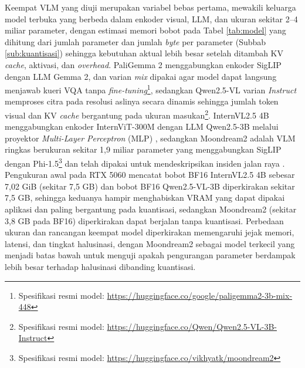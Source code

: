 Keempat VLM yang diuji merupakan variabel bebas pertama, mewakili keluarga model terbuka yang berbeda dalam enkoder visual, LLM, dan ukuran sekitar 2--4 miliar parameter, dengan estimasi memori bobot pada Tabel \ref{tab:model} yang dihitung dari jumlah parameter dan jumlah \textit{byte} per parameter (Subbab \ref{sub:kuantisasi}) sehingga kebutuhan aktual lebih besar setelah ditambah KV \textit{cache}, aktivasi, dan \textit{overhead}. PaliGemma 2 menggabungkan enkoder SigLIP dengan LLM Gemma 2, dan varian \textit{mix} dipakai agar model dapat langsung menjawab kueri VQA tanpa \textit{fine-tuning}\footnote{Spesifikasi resmi model: \url{https://huggingface.co/google/paligemma2-3b-mix-448}}, sedangkan Qwen2.5-VL varian \textit{Instruct} memproses citra pada resolusi aslinya secara dinamis sehingga jumlah token visual dan KV \textit{cache} bergantung pada ukuran masukan\footnote{Spesifikasi resmi model: \url{https://huggingface.co/Qwen/Qwen2.5-VL-3B-Instruct}}. InternVL2.5 4B menggabungkan enkoder InternViT-300M dengan LLM Qwen2.5-3B melalui proyektor \textit{Multi-Layer Perceptron} (MLP) \cite{ref29}, sedangkan Moondream2 adalah VLM ringkas berukuran sekitar 1,9 miliar parameter yang menggabungkan SigLIP dengan Phi-1.5\footnote{Spesifikasi resmi model: \url{https://huggingface.co/vikhyatk/moondream2}} \cite{ref14} dan telah dipakai untuk mendeskripsikan insiden jalan raya \cite{ref31}. Pengukuran awal pada RTX 5060 mencatat bobot BF16 InternVL2.5 4B sebesar 7,02 GiB (sekitar 7,5 GB) dan bobot BF16 Qwen2.5-VL-3B diperkirakan sekitar 7,5 GB, sehingga keduanya hampir menghabiskan VRAM yang dapat dipakai aplikasi dan paling bergantung pada kuantisasi, sedangkan Moondream2 (sekitar 3,8 GB pada BF16) diperkirakan dapat berjalan tanpa kuantisasi. Perbedaan ukuran dan rancangan keempat model diperkirakan memengaruhi jejak memori, latensi, dan tingkat halusinasi, dengan Moondream2 sebagai model terkecil yang menjadi batas bawah untuk menguji apakah pengurangan parameter berdampak lebih besar terhadap halusinasi dibanding kuantisasi.

